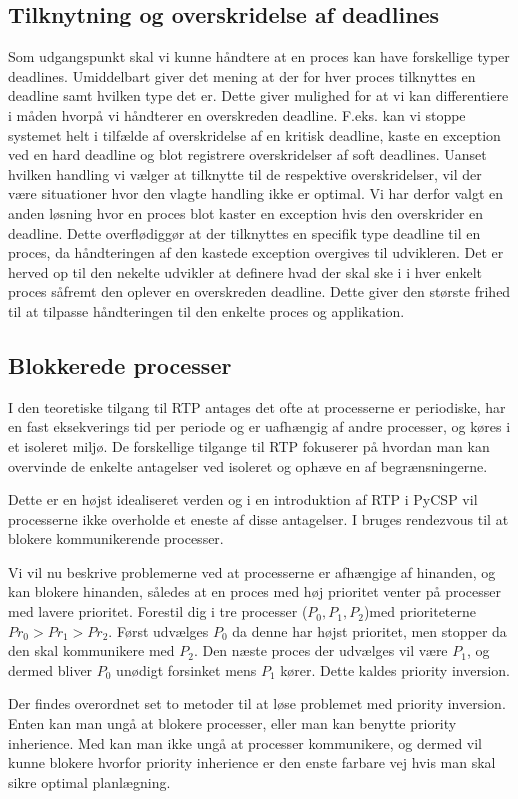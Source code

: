 \subsection{Tilknytning og overskridelse af deadlines}
Som udgangspunkt skal vi kunne håndtere at en proces kan have forskellige typer deadlines. Umiddelbart giver det mening at der for hver proces tilknyttes en deadline samt hvilken type det er. Dette giver mulighed for at vi kan differentiere i måden hvorpå vi håndterer en overskreden deadline. F.eks. kan vi stoppe systemet helt i tilfælde af overskridelse af en kritisk deadline, kaste en exception ved en hard deadline og blot registrere overskridelser af soft deadlines. Uanset hvilken handling vi vælger at tilknytte til de respektive overskridelser, vil der være situationer hvor den vlagte handling ikke er optimal. Vi har derfor valgt en anden løsning hvor en proces blot kaster en exception hvis den overskrider en deadline. Dette overflødiggør at der tilknyttes en specifik type deadline til en proces, da håndteringen af den kastede exception overgives til udvikleren. Det er herved op til den nekelte udvikler at definere hvad der skal ske i i hver enkelt proces såfremt den oplever en overskreden deadline. Dette giver den største frihed til at tilpasse håndteringen til den enkelte proces og applikation. 

\begin{shaded}
\subsection{Blokkerede processer}
I den teoretiske tilgang til RTP antages det ofte at processerne er periodiske, har en fast eksekverings tid per periode og er uafhængig af andre processer, og køres i et isoleret miljø. De forskellige tilgange til RTP fokuserer på hvordan man kan overvinde de enkelte antagelser ved isoleret og ophæve en af begrænsningerne. 


Dette er en højst idealiseret verden og i en introduktion af RTP i PyCSP vil processerne ikke overholde et eneste af disse antagelser. 
I \pycsp bruges rendezvous til at blokere kommunikerende processer.

Vi vil nu beskrive problemerne ved at processerne er afhængige af hinanden, og kan blokere hinanden, således at en proces med høj prioritet venter på processer med lavere prioritet. Forestil dig i \pycsp tre processer ($P_0,P_1,P_2$)med prioriteterne $Pr_0>Pr_1>Pr_2$. Først udvælges $P_0$ da denne har højst prioritet, men stopper da den skal kommunikere med $P_2$. Den næste proces der udvælges vil være $P_1$, og dermed bliver $P_0$ unødigt forsinket mens $P_1$ kører. Dette kaldes priority inversion\cite{sha1990priority}.

Der findes overordnet set to metoder til at løse problemet med priority inversion. Enten kan man ungå at blokere processer, eller man kan benytte priority inherience\cite{sha1990priority}. Med \pycsp kan man ikke ungå at processer kommunikere, og dermed vil kunne blokere hvorfor priority inherience er den enste farbare vej hvis man skal sikre optimal planlægning.
\end{shaded}


